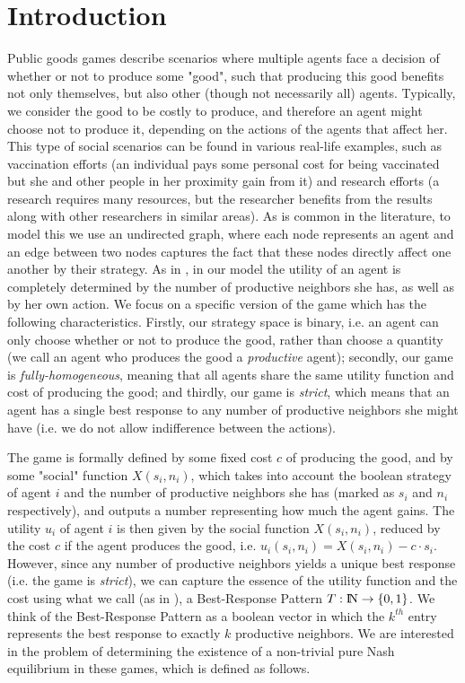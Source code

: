 \documentclass[runningheads]{llncs}
\begin{document}
\section{Introduction}
Public goods games describe scenarios where multiple agents face a decision of whether or not to produce some "good", such that producing this good benefits not only themselves, but also other (though not necessarily all) agents. Typically, we consider the good to be costly to produce, and therefore an agent might choose not to produce it, depending on the actions of the agents that affect her. This type of social scenarios can be found in various real-life examples, such as vaccination efforts (an individual pays some personal cost for being vaccinated but she and other people in her proximity gain from it) and research efforts (a research requires many resources, but the researcher benefits from the results along with other researchers in similar areas).
As is common in the literature, to model this we use an undirected graph, where each node represents an agent and an edge between two nodes captures the fact that these nodes directly affect one another by their strategy. As in \cite{Modifications,Parameterized,Directed_Paper,point_out_flaw,general_homogeneous_corrected}, in our model the utility of an agent is completely determined by the number of productive neighbors she has, as well as by her own action. We focus on a specific version of the game which has the following characteristics. Firstly, our strategy space is binary, i.e. an agent can only choose whether or not to produce the good, rather than choose a quantity (we call an agent who produces the good a \textit{productive} agent); secondly, our game is \textit{fully-homogeneous}, meaning that all agents share the same utility function and cost of producing the good; and thirdly, our game is \textit{strict}, which means that an agent has a single best response to any number of productive neighbors she might have (i.e. we do not allow indifference between the actions).

The game is formally defined by some fixed cost $c$ of producing the good, and by some "social" function $X(s_i,n_i)$, which takes into account the boolean strategy of agent $i$ and the number of productive neighbors she has (marked as $s_i$ and $n_i$ respectively), and outputs a number representing how much the agent gains. The utility $u_i$ of agent $i$ is then given by the social function $X(s_i,n_i)$, reduced by the cost $c$ if the agent produces the good, i.e.
$u_i(s_i,n_i)=X(s_i,n_i)-c\cdot s_i$.
However, since any number of productive neighbors yields a unique best response (i.e. the game is \textit{strict}), we can capture the essence of the utility function and the cost using what we call (as in \cite{Gilboa_Nisan_public_goods}), a Best-Response Pattern $T:{\rm I\!N} \rightarrow \{0,1\}$. We think of the Best-Response Pattern as a boolean vector in which the $k^{th}$ entry represents the best response to exactly $k$ productive neighbors. We are interested in the problem of determining the existence of a non-trivial pure Nash equilibrium in these games, which is defined as follows.
\end{document}
